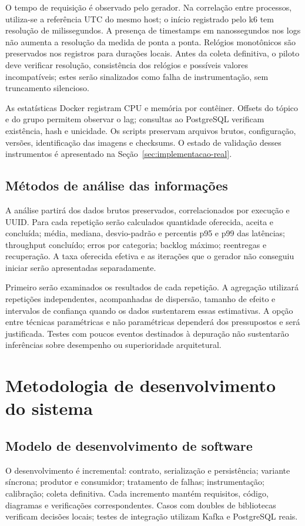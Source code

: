 O tempo de requisição é observado pelo gerador. Na correlação entre processos, utiliza-se a referência UTC do mesmo host; o início registrado pelo k6 tem resolução de milissegundos. A presença de timestamps em nanossegundos nos logs não aumenta a resolução da medida de ponta a ponta. Relógios monotônicos são preservados nos registros para durações locais. Antes da coleta definitiva, o piloto deve verificar resolução, consistência dos relógios e possíveis valores incompatíveis; estes serão sinalizados como falha de instrumentação, sem truncamento silencioso.

As estatísticas Docker registram CPU e memória por contêiner. Offsets do tópico e do grupo permitem observar o lag; consultas ao PostgreSQL verificam existência, hash e unicidade. Os scripts preservam arquivos brutos, configuração, versões, identificação das imagens e checksums. O estado de validação desses instrumentos é apresentado na Seção~\ref{sec:implementacao-real}.

\subsection{Métodos de análise das informações}
A análise partirá dos dados brutos preservados, correlacionados por execução e UUID. Para cada repetição serão calculados quantidade oferecida, aceita e concluída; média, mediana, desvio-padrão e percentis p95 e p99 das latências; throughput concluído; erros por categoria; backlog máximo; reentregas e recuperação. A taxa oferecida efetiva e as iterações que o gerador não conseguiu iniciar serão apresentadas separadamente.

Primeiro serão examinados os resultados de cada repetição. A agregação utilizará repetições independentes, acompanhadas de dispersão, tamanho de efeito e intervalos de confiança quando os dados sustentarem essas estimativas. A opção entre técnicas paramétricas e não paramétricas dependerá dos pressupostos e será justificada. Testes com poucos eventos destinados à depuração não sustentarão inferências sobre desempenho ou superioridade arquitetural.

\section{Metodologia de desenvolvimento do sistema}

\subsection{Modelo de desenvolvimento de software}
O desenvolvimento é incremental: contrato, serialização e persistência; variante síncrona; produtor e consumidor; tratamento de falhas; instrumentação; calibração; coleta definitiva. Cada incremento mantém requisitos, código, diagramas e verificações correspondentes. Casos com doubles de bibliotecas verificam decisões locais; testes de integração utilizam Kafka e PostgreSQL reais.

